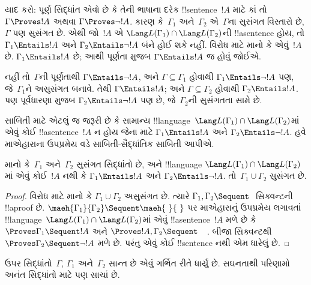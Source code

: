 \documentclass[../../../include/open-logic-section]{subfiles}
\begin{document}
યાદ કરો: પૂર્ણ સિદ્ધાંત એવો છે કે તેની
ભાષાના દરેક !!{sentence}~$!A$ માટે
કાં તો $\Gamma \Proves !A$ અથવા
$\Gamma \Proves \lnot !A$.
કારણ કે~$\Gamma_1$ અને~$\Gamma_2$
એ~$\Gamma$ના સુસંગત વિસ્તારો છે,
$\Gamma$ પણ સુસંગત છે.
એથી જો~$!A$ એ
$\Lang L(\Gamma_1) \cap
\Lang L(\Gamma_2)$ની
!!a{sentence} હોય, તો
$\Gamma_1 \Entails !A$ અને
$\Gamma_2 \Entails \lnot !A$
બંને હોઈ શકે નહીં.
વિરોધ માટે માનો કે એવું~$!A$ છે.
$\Gamma_1 \Entails !A$ છે;
આથી પૂર્ણતા મુજબ
$\Gamma \Entails !A$ જ હોવું જોઈએ.

નહીં તો~$\Gamma$ની પૂર્ણતાથી
$\Gamma \Entails \lnot !A$,
અને $\Gamma \subseteq \Gamma_1$
હોવાથી
$\Gamma_1 \Entails \lnot !A$ પણ,
જે~$\Gamma_1$ને અસુસંગત બનાવે.
તેથી $\Gamma \Entails !A$;
અને $\Gamma \subseteq \Gamma_2$
હોવાથી
$\Gamma_2 \Entails !A$.
પણ પૂર્વધારણા મુજબ
$\Gamma_2 \Entails \lnot !A$ પણ છે,
જે~$\Gamma_2$ની સુસંગતતા સામે છે.


સાબિતી માટે એટલું જ જરૂરી છે કે
સામાન્ય
!!{language}~$\Lang L(\Gamma_1)
\cap \Lang L(\Gamma_2)$માં
એવું કોઈ !!a{sentence}~$!A$ ન હોય
જેના માટે
$\Gamma_1 \Entails !A$ અને
$\Gamma_2 \Entails \lnot !A$.
હવે માએહારાના ઉપપ્રમેય વડે
સાબિતી-સૈદ્ધાંતિક સાબિતી આપીએ.

\begin{thm}
માનો કે~$\Gamma_1$ અને~$\Gamma_2$
સુસંગત સિદ્ધાંતો છે, અને
!!{language}
$\Lang L(\Gamma_1) \cap
\Lang L(\Gamma_2)$માં એવું
કોઈ~$!A$ નથી કે
$\Gamma_1 \Entails !A$ અને
$\Gamma_2 \Entails \lnot !A$.
તો~$\Gamma_1 \cup \Gamma_2$
સુસંગત છે.
\end{thm}

\begin{proof}
  વિરોધ માટે માનો કે
  $\Gamma_1 \cup \Gamma_2$
  અસુસંગત છે. ત્યારે
  $\Gamma_1, \Gamma_2 \Sequent \ $
  સિક્વન્ટની !!a{proof} છે.
  $\maeh{\Gamma_1}{\Gamma_2}
  \Sequent \maeh{\ }{\ }$
  પર માએહારાનું ઉપપ્રમેય
  લગાવતાં
  !!{language}~$\Lang L(\Gamma_1)
  \cap \Lang L(\Gamma_2)$માં
  એવું !!a{sentence}~$!A$ મળે છે કે
  $\Proves \Gamma_1 \Sequent !A$
  અને
  $\Proves !A, \Gamma_2 \Sequent \quad$.
  બીજા સિક્વન્ટથી
  $\Proves \Gamma_2 \Sequent \lnot !A$
  મળે છે. પરંતુ એવું કોઈ
  !!{sentence} નથી એમ ધારેલું છે.
\end{proof}

ઉપર સિદ્ધાંતો~$\Gamma$,
$\Gamma_1$ અને~$\Gamma_2$
સાન્ત છે એવું ગર્ભિત રીતે
ધાર્યું છે. સઘનતાથી પરિણામો
અનંત સિદ્ધાંતો માટે પણ સાચાં છે.
\end{document}
